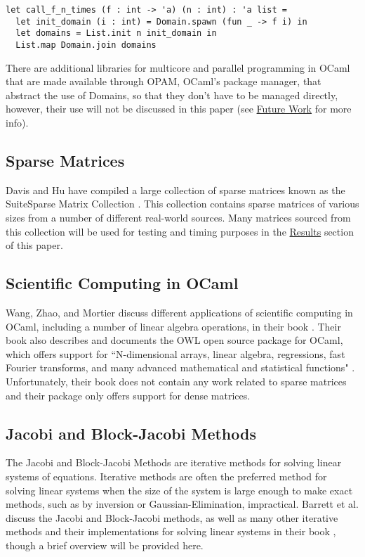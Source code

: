 \documentclass[pageno]{jpaper}
\begin{document}
\begin{doublespacing}
\begin{verbatim}
let call_f_n_times (f : int -> 'a) (n : int) : 'a list =
  let init_domain (i : int) = Domain.spawn (fun _ -> f i) in
  let domains = List.init n init_domain in
  List.map Domain.join domains
\end{verbatim}

There are additional libraries for multicore and parallel programming in OCaml that are made available through OPAM, OCaml's package manager, that abstract the use of Domains, so that they don't have to be managed directly, however, their use will not be discussed in this paper (see \hyperref[sec:future-work]{Future Work} for more info).

\subsection{Sparse Matrices}
Davis and Hu have compiled a large collection of sparse matrices known as the SuiteSparse Matrix Collection \cite{davis-sparse-matrix}. This collection contains sparse matrices of various sizes from a number of different real-world sources. Many matrices sourced from this collection will be used for testing and timing purposes in the \hyperref[sec:results]{Results} section of this paper.

\subsection{Scientific Computing in OCaml}
Wang, Zhao, and Mortier discuss different applications of scientific computing in OCaml, including a number of linear algebra operations, in their book \cite{wang-owl-book}. Their book also describes and documents the OWL open source package for OCaml, which offers support for ``N-dimensional arrays, linear algebra, regressions, fast Fourier transforms, and many advanced mathematical and statistical functions" \cite{ocaml-owl}. Unfortunately, their book does not contain any work related to sparse matrices and their package only offers support for dense matrices.

\subsection{Jacobi and Block-Jacobi Methods}
The Jacobi and Block-Jacobi Methods are iterative methods for solving linear systems of equations. Iterative methods are often the preferred method for solving linear systems when the size of the system is large enough to make exact methods, such as by inversion or Gaussian-Elimination, impractical. Barrett et al. discuss the Jacobi and Block-Jacobi methods, as well as many other iterative methods and their implementations for solving linear systems in their book \cite{templates}, though a brief overview will be provided here.


\end{doublespacing}
\end{document}
